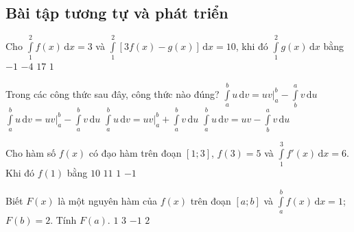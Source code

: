 \subsection{Bài tập tương tự và phát triển}
\begin{ex}%
	Cho $\displaystyle\int\limits_1^2 f(x)\mathrm{\,d}x = 3$ và $\displaystyle\int\limits_1^2 \left[3f(x) - g(x)\right]\mathrm{\,d}x = 10$, khi đó $\displaystyle\int\limits_1^2 g(x)\mathrm{\,d}x$ bằng
	\choice
	{\True $-1$}
	{$-4$}
	{$17$}
	{$1$}
\end{ex}
\begin{ex}%
	Trong các công thức sau đây, công thức nào đúng?
	\choice
	{$\displaystyle\int\limits_a^b u\mathrm{\,d}v = uv \bigg|_a^b - \displaystyle\int\limits_b^a v\mathrm{\,d}u$}
	{\True $\displaystyle\int\limits_a^b u\mathrm{\,d}v = uv \bigg|_a^b - \displaystyle\int\limits_a^b v\mathrm{\,d}u$}
	{$\displaystyle\int\limits_a^b u\mathrm{\,d}v = uv \bigg|_a^b + \displaystyle\int\limits_a^b v\mathrm{\,d}u$}
	{$\displaystyle\int\limits_a^b u\mathrm{\,d}v = uv  - \displaystyle\int\limits_b^a v\mathrm{\,d}u$}
\end{ex}
\begin{ex}%
	Cho hàm số $f(x)$ có đạo hàm trên đoạn $[1; 3]$, $f(3) = 5$ và $\displaystyle\int\limits_1^3 f'(x)\mathrm{\,d}x = 6$. Khi đó $f(1)$ bằng
	\choice
	{$10$}
	{$11$}
	{$1$}
	{\True $-1$}
\end{ex}
\begin{ex}%
	Biết $F(x)$ là một nguyên hàm của $f(x)$ trên đoạn $[a; b]$ và $\displaystyle\int\limits_a^b f(x)\mathrm{\,d}x = 1$; $F(b) = 2$. Tính $F(a)$.
	\choice
	{\True $1$}
	{$3$}
	{$-1$}
	{$2$}
\end{ex}
